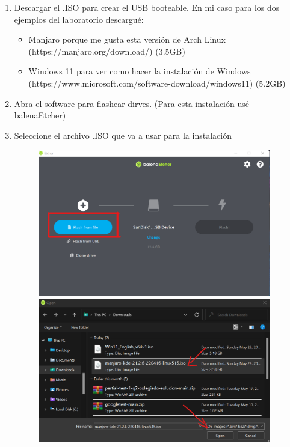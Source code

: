 \documentclass[stu, 12pt, letterpaper, donotrepeattitle, floatsintext, natbib, helv]{apa7}
\begin{document}
\begin{enumerate}
    \item Descargar el .ISO para crear el USB booteable. En mi caso para los dos ejemplos del laboratorio descargué:
    \begin{itemize}
        \item Manjaro porque me gusta esta versión de Arch Linux (https://manjaro.org/download/) (3.5GB)
        \item Windows 11 para ver como hacer la instalación de Windows (https://www.microsoft.com/software-download/windows11) (5.2GB)
    \end{itemize}
    \item Abra el software para flashear dirves. (Para esta instalación usé balenaEtcher)
    \item Seleccione el archivo .ISO que va a usar para la instalación
    \begin{figure}[H]
        \includegraphics[width = 0.96\textwidth]{SelectISO.png}
        \includegraphics[width = 0.96\textwidth]{SelectISO2.png}

\end{figure}
\end{enumerate}
\end{document}
